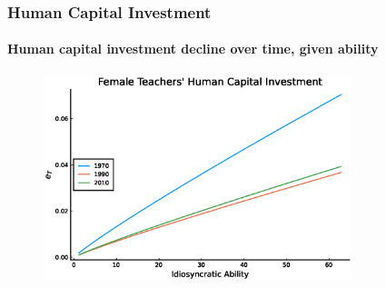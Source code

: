 \documentclass[11pt]{beamer}
\begin{document}
\begin{frame}
	\frametitle{Human Capital Investment}
	\framesubtitle{Human capital investment decline over time, given ability}
	\begin{figure}
		\begin{center}
			\includegraphics[width=0.8\textwidth]{plots/eT_women_steadystate.eps}
			\label{ }
		\end{center}
	\end{figure}
\end{frame}


			

\end{document}
